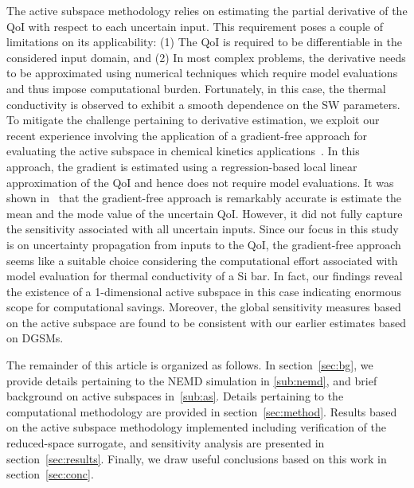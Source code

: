 The active subspace methodology relies on estimating the partial derivative of the QoI 
with respect to each uncertain input. This requirement poses a couple of limitations on its
applicability: (1) The QoI is required to be differentiable in the considered input domain, and (2)
In most complex problems, the derivative needs to be approximated using numerical techniques
which require model evaluations and thus impose computational burden. Fortunately, in this case,
the thermal conductivity is observed to exhibit a smooth dependence on the SW parameters. 
To mitigate the challenge pertaining to derivative estimation, we exploit our recent experience
involving the application of a gradient-free approach for evaluating the active subspace in
chemical kinetics applications~\cite{Vohra:2018c}. In this approach, the gradient is estimated
using a regression-based local linear approximation of the QoI and hence does not require
model evaluations. It was shown in~\cite{Vohra:2018c} that the gradient-free approach is
remarkably accurate is estimate the mean and the mode value of the uncertain QoI. However,
it did not fully capture the sensitivity associated with all uncertain inputs. Since our focus
in this study is on uncertainty propagation from inputs to the QoI, the gradient-free approach
seems like a suitable choice considering the computational effort associated with model 
evaluation for thermal conductivity of a Si bar. In fact, our findings reveal the existence of a 
1-dimensional active subspace in this case indicating enormous scope for computational savings.
Moreover, the global sensitivity measures based
on the active subspace are found to be consistent with our earlier estimates based on DGSMs. 

The remainder of this article is organized as follows. In section~\ref{sec:bg}, we provide details
pertaining to the NEMD simulation in \ref{sub:nemd}, and brief background on active subspaces
in~\ref{sub:as}. Details pertaining to the computational methodology are
provided in section~\ref{sec:method}. Results based on the active subspace methodology
implemented including verification of the reduced-space surrogate, and sensitivity analysis
are presented in section~\ref{sec:results}. Finally, we draw useful conclusions based on this
work in section~\ref{sec:conc}.
































